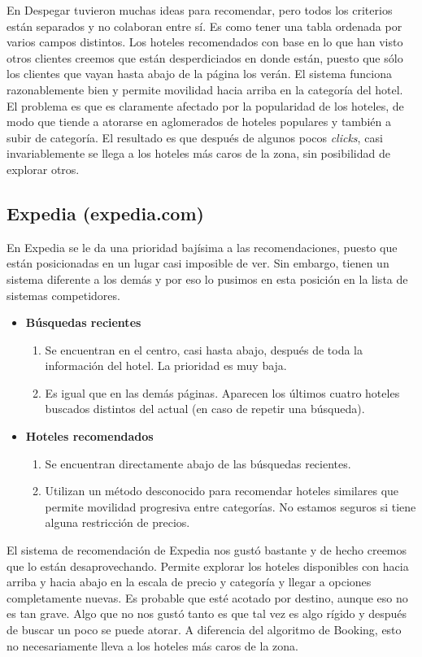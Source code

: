 \documentclass[12pt]{report}
\begin{document}
En Despegar tuvieron muchas ideas para recomendar, pero todos los criterios están separados y no colaboran entre sí. Es como tener una tabla ordenada por varios campos distintos. Los hoteles recomendados con base en lo que han visto otros clientes creemos que están desperdiciados en donde están, puesto que sólo los clientes que vayan hasta abajo de la página los verán. El sistema funciona razonablemente bien y permite movilidad hacia arriba en la categoría del hotel. El problema es que es claramente afectado por la popularidad de los hoteles, de modo que tiende a atorarse en aglomerados de hoteles populares y también a subir de categoría. El resultado es que después de algunos pocos \emph{clicks}, casi invariablemente se llega a los hoteles más caros de la zona, sin posibilidad de explorar otros.

\subsection*{Expedia (expedia.com)}

En Expedia se le da una prioridad bajísima a las recomendaciones, puesto que están posicionadas en un lugar casi imposible de ver. Sin embargo, tienen un sistema diferente a los demás y por eso lo pusimos en esta posición en la lista de sistemas competidores.
\begin{itemize}
	\item \textbf{Búsquedas recientes}
	\begin{enumerate}
		\item Se encuentran en el centro, casi hasta abajo, después de toda la información del hotel. La prioridad es muy baja.
		\item Es igual que en las demás páginas. Aparecen los últimos cuatro hoteles buscados distintos del actual (en caso de repetir una búsqueda).
	\end{enumerate}
	\item \textbf{Hoteles recomendados}
	\begin{enumerate}
		\item Se encuentran directamente abajo de las búsquedas recientes.
		\item Utilizan un método desconocido para recomendar hoteles similares que permite movilidad progresiva entre categorías. No estamos seguros si tiene alguna restricción de precios.
	\end{enumerate}
\end{itemize}
El sistema de recomendación de Expedia nos gustó bastante y de hecho creemos que lo están desaprovechando. Permite explorar los hoteles disponibles con hacia arriba y hacia abajo en la escala de precio y categoría y llegar a opciones completamente nuevas. Es probable que esté acotado por destino, aunque eso no es tan grave. Algo que no nos gustó tanto es que tal vez es algo rígido y después de buscar un poco se puede atorar. A diferencia del algoritmo de Booking, esto no necesariamente lleva a los hoteles más caros de la zona.
\end{document}
